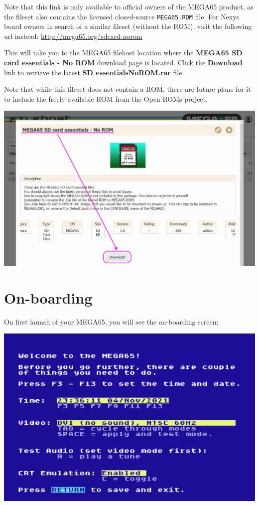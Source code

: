 Note that this link is only available to official owners of the MEGA65 product, as the fileset also contains the licensed closed-source {\tt MEGA65.ROM} file.
\ifdefined\printmanual
\else
For Nexys board owners in search of a similar fileset (without the ROM), visit the following url instead: \url{http://mega65.org/sdcard-norom}

This will take you to the MEGA65 filehost location where the \textbf{MEGA65 SD card essentials - No ROM} download
page is located. Click the \textbf{Download} link to retrieve the latest \textbf{SD essentialsNoROM.rar} file.

Note that while this fileset does not contain a ROM, there are future plans for it to include the freely available ROM from the Open ROMs project.

\includegraphics[width=\linewidth]{images/latest_support_files.png}
\fi

\section{On-boarding}
\label{onboarding}

On first launch of your MEGA65, you will see the on-boarding screen:

\begin{center}
  \includegraphics[trim= 10mm 15mm 10mm 10mm,clip,width=0.7\linewidth]{images/img011_final_boot_01.png}
\end{center}

